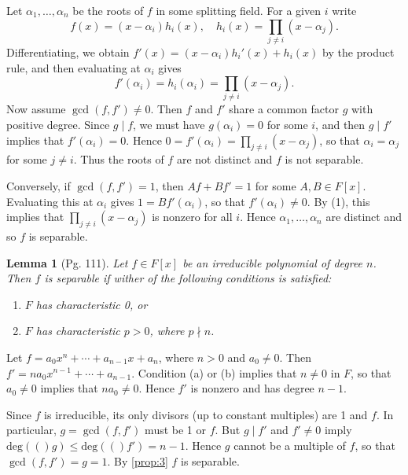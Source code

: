 \documentclass[leqno]{article}
\makeatletter
\newcommand{\deg}[1]{\text{deg}(#1)}
\newtheorem{lemma}{Lemma}
\theoremstyle{definition}
\theoremstyle{remark}
\let\oldproofname=\proofname
\renewcommand{\proofname}{\textit{\oldproofname}}
\theoremstyle{definition}
\renewenvironment{proof}[1][\proofname]{\par
  \pushQED{\qed}%
  \normalfont \topsep6\p@\@plus6\p@\relax
  \list{}{\leftmargin=0mm
          \rightmargin=0mm
          \settowidth{\itemindent}{\itshape#1}%
          \labelwidth=\itemindent
          \parsep=0pt \listparindent=0mm%
  }
  \item[\hskip\labelsep
        \itshape
    #1\@addpunct{.}]\ignorespaces
}{%
  \popQED\endlist\@endpefalse
}
\makeatother
\begin{document}
        \begin{proof}
            Let $\alpha_1,\dots,\alpha_n$ be the roots of $f$ in some splitting field. For a given $i$ write 
                \begin{equation*}
                    f(x)=(x-\alpha_i)h_i(x),\quad h_i(x)=\prod_{j\neq i}(x-\alpha_j).
                \end{equation*}
            Differentiating, we obtain $f'(x)=(x-\alpha_i)h_i'(x)+h_i(x)$ by the product rule, and then evaluating at $\alpha_i$ gives
                \begin{equation}
                    f'(\alpha_i)=h_i(\alpha_i)=\prod_{j\neq i}(x-\alpha_j).
                \end{equation}
            Now assume $\gcd(f,f')\neq 0$. Then $f$ and $f'$ share a common factor $g$ with positive degree. Since $g\mid f$, we must have $g(\alpha_i)=0$ for some $i$, and then $g\mid f'$ implies that $f'(\alpha_i)=0$. Hence $0=f'(\alpha_i)=\prod_{j\neq i}(x-\alpha_j)$, so that $\alpha_i=\alpha_j$ for some $j\neq i$. Thus the roots of $f$ are not distinct and $f$ is not separable.\par\hspace{4mm} Conversely, if $\gcd(f,f')=1$, then $Af+Bf'=1$ for some $A,B\in F[x]$. Evaluating this at $\alpha_i$ gives $1=Bf'(\alpha_i)$, so that $f'(\alpha_i)\neq 0$. By (1), this implies that $\prod_{j\neq i}(x-\alpha_j)$ is nonzero for all $i$. Hence $\alpha_1,\dots,\alpha_n$ are distinct and so $f$ is separable.
        \end{proof}
    \begin{lemma}[Pg. 111]\label{lem:11}
        Let $f\in F[x]$ be an irreducible polynomial of degree $n$. Then $f$ is separable if wither of the following conditions is satisfied:
            \begin{enumerate}[label=\normalfont{(\alph*)}]
                \item $F$ has characteristic 0, or
                \item $F$ has characteristic $p>0$, where $p\nmid n$.
            \end{enumerate}
    \end{lemma}
        \begin{proof}
            Let $f=a_0x^n+\cdots+a_{n-1}x+a_n$, where $n>0$ and $a_0\neq 0$. Then $f'=na_0x^{n-1}+\cdots+a_{n-1}$. Condition (a) or (b) implies that $n\neq0$ in $F$, so that $a_0\neq 0$ implies that $na_0\neq0$. Hence $f'$ is nonzero and has degree $n-1$.\par\hspace{4mm} Since $f$ is irreducible, its only divisors (up to constant multiples) are 1 and $f$. In particular, $g=\gcd(f,f')$ must be 1 or $f$. But $g\mid f'$ and $f'\neq 0$ imply $\deg(g)\leq\deg(f')=n-1$. Hence $g$ cannot be a multiple of $f$, so that $\gcd(f,f')=g=1$. By \cref{prop:3} $f$ is separable. 
        \end{proof}
\end{document}
